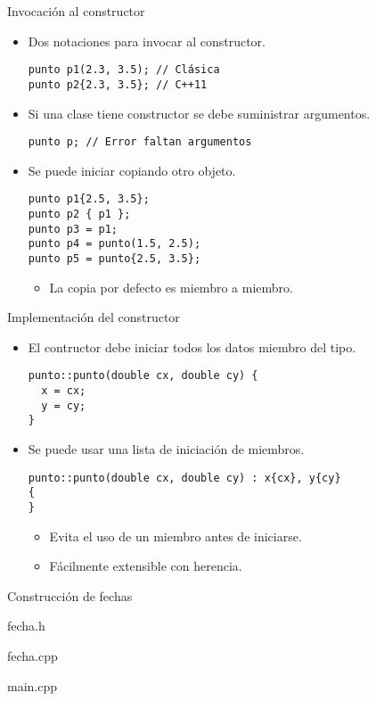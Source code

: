 \begin{frame}[fragile]{Invocación al constructor}
\begin{itemize}
  \item Dos notaciones para invocar al constructor.
\begin{lstlisting}
punto p1(2.3, 3.5); // Clásica
punto p2{2.3, 3.5}; // C++11
\end{lstlisting}
  \item Si una clase tiene constructor se debe suministrar argumentos.
\begin{lstlisting}
punto p; // Error faltan argumentos
\end{lstlisting}
  \item Se puede iniciar copiando otro objeto.
\begin{lstlisting}
punto p1{2.5, 3.5};
punto p2 { p1 };
punto p3 = p1;
punto p4 = punto(1.5, 2.5);
punto p5 = punto{2.5, 3.5};
\end{lstlisting}
    \begin{itemize}
      \item La copia por defecto es miembro a miembro.
    \end{itemize}
\end{itemize}
\end{frame}

\begin{frame}[fragile]{Implementación del constructor}
\begin{itemize}
  \item El contructor debe iniciar todos los datos miembro del tipo.
\begin{lstlisting}
punto::punto(double cx, double cy) {
  x = cx;
  y = cy;
}
\end{lstlisting}
  \item Se puede usar una lista de iniciación de miembros.
\begin{lstlisting}
punto::punto(double cx, double cy) : x{cx}, y{cy}
{
}
\end{lstlisting}
    \begin{itemize}
      \item Evita el uso de un miembro antes de iniciarse.
      \item Fácilmente extensible con herencia.
    \end{itemize}
\end{itemize}
\end{frame}

\begin{frame}{Construcción de fechas}
\begin{block}{fecha.h}

\end{block}
\end{frame}

\begin{frame}
\begin{block}{fecha.cpp}

\end{block}
\end{frame}

\begin{frame}
\begin{block}{main.cpp}

\end{block}
\end{frame}

